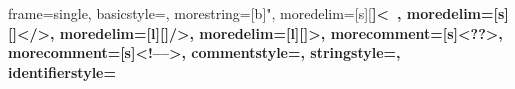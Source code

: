 \usepackage[raiselinks=true,                    %
            bookmarks=true,                     %
            bookmarksopenlevel=1,               %
            bookmarksopen=true,
            bookmarksnumbered=true,
            hyperindex=true,
            plainpages=false,
            pdfpagelabels=true,
            pdfborder={0 0 0.5},
            colorlinks=false,
            linkbordercolor=kitcolor,
            citebordercolor=kitcolor]{hyperref}

\RequirePackage{scrlfile}                       %
\usepackage{svg}                                %
\usepackage[acronyms,nonumberlist]{glossaries}
\makeglossaries

\usepackage[shortlabels]{enumitem}
\usepackage{makecell}
\usepackage{slashed}
\usepackage{mathtools}
\usepackage{xargs}
\usepackage{listings}
{	
	frame=single,
	basicstyle=\ttfamily\footnotesize,
	morestring=[b]",
	moredelim=[s][\bfseries\color{violet}]{<}{\ },
	moredelim=[s][\bfseries\color{violet}]{</}{>},
	moredelim=[l][\bfseries\color{violet}]{/>},
	moredelim=[l][\bfseries\color{violet}]{>},
	morecomment=[s]{<?}{?>},
	morecomment=[s]{<!--}{-->},
	commentstyle=\color{gray},
	stringstyle=\color{brown},
	identifierstyle=\color{magenta}
}
\usepackage{verbatim}
\usetikzlibrary{babel} 
\usepackage[compat=1.1.0]{tikz-feynman}